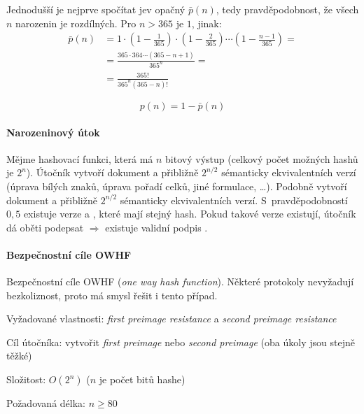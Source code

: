 Jednodušší je nejprve spočítat jev opačný $\bar p(n)$, tedy pravděpodobnost, že všech $n$ narozenin je rozdílných. Pro $n > 365$ je $1$, jinak:
\begin{equation}
\begin{aligned}
\bar p(n) &= 1 \cdot \left(1-\frac{1}{365}\right) \cdot \left(1-\frac{2}{365}\right) \cdots \left(1-\frac{n-1}{365}\right) = \\
&=  \frac{365 \cdot 364 \cdots (365-n+1)}{365^n} = \\
&=  \frac{365!}{365^n (365-n)!}
\end{aligned}
\end{equation}

\begin{equation}
    p(n) = 1 - \bar p(n)
\end{equation}

\paragraph*{Narozeninový útok} Mějme hashovací funkci, která má $n$ bitový výstup (celkový počet možných hashů je $2^{n}$). Útočník vytvoří dokument  a přibližně $2^{n/2}$ sémanticky ekvivalentních verzí (úprava bílých znaků, úprava pořadí celků, jiné formulace, \dots). Podobně vytvoří dokument  a přibližně $2^{n/2}$ sémanticky ekvivalentních verzí. S~pravděpodobností $0,5$ existuje verze  a , které mají stejný hash. Pokud takové verze existují, útočník dá oběti podepsat  $\Rightarrow$ existuje validní podpis .

\paragraph*{Bezpečnostní cíle OWHF} Bezpečnostní cíle OWHF (\textit{one way hash function}). Některé protokoly nevyžadují bezkoliznost, proto má smysl řešit i tento případ. \begin{compactitem}
    \item Vyžadované vlastnosti: \textit{first preimage resistance} a \textit{second preimage resistance}
    \item Cíl útočníka: vytvořit \textit{first preimage} nebo \textit{second preimage} (oba úkoly jsou stejně těžké)
    \item Složitost: $O(2^n)$ ($n$ je počet bitů hashe)
    \item Požadovaná délka: $n \geq 80$
\end{compactitem}

